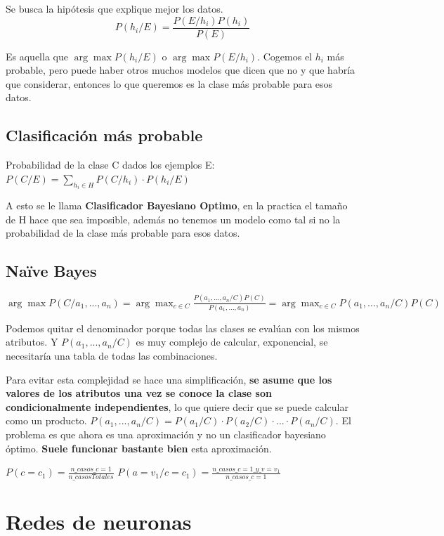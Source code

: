 \documentclass[12pt]{report} %
\begin{document}
Se busca la hipótesis que explique mejor los datos.
\[P(h_i/E)= \frac {P(E/h_i)P(h_i)}{P(E)}\]

Es aquella que \(\arg \max P(h_i/E)\) o $\arg \max P(E/h_i) $.
Cogemos el \(h_i\) más probable, pero puede haber otros muchos modelos
que dicen que no y que habría que considerar, entonces lo que queremos
es la clase más probable para esos datos.

\subsection{Clasificación más
probable}

Probabilidad de la clase C dados los ejemplos E:
\(P(C/E) = \sum _{h_i \in H} P(C/h_i) \cdot P(h_i/E)\)

A esto se le llama \textbf{Clasificador Bayesiano Optimo}, en la
practica el tamaño de H hace que sea imposible, además no tenemos un
modelo como tal si no la probabilidad de la clase más probable para esos
datos.

\subsection{Naïve Bayes}

\(\arg \max P(C/a_1, ...,a_n)= \arg \max _{c \in C} \frac {P(a_1, ...,a_n/C)P(C)}{P(a_1, ...,a_n)}=\arg \max_{c \in C} P(a_1, ...,a_n/C)P(C)\)

Podemos quitar el denominador porque todas las clases se evalúan con los
mismos atributos. Y \(P(a_1, ...,a_n/C)\) es muy complejo de calcular,
exponencial, se necesitaría una tabla de todas las combinaciones.

Para evitar esta complejidad se hace una simplificación, \textbf{se
asume que los valores de los atributos una vez se conoce la clase son
condicionalmente independientes}, lo que quiere decir que se puede
calcular como un producto.
\(P(a_1, ...,a_n/C) = P(a_1/C) \cdot P(a_2/C) \cdot ... \cdot P(a_n/C)\).
El problema es que ahora es una aproximación y no un clasificador
bayesiano óptimo. \textbf{Suele funcionar bastante bien} esta
aproximación.

\(P(c=c_1)= \frac {n\_casos\_c=1}{n\_casosTotales}\)
\(P(a=v_1/c=c_1)= \frac {n\_casos\_c=1\_y\_v=v_1}{n\_casos\_c=1}\)

\section{Redes de neuronas}
\end{document}
